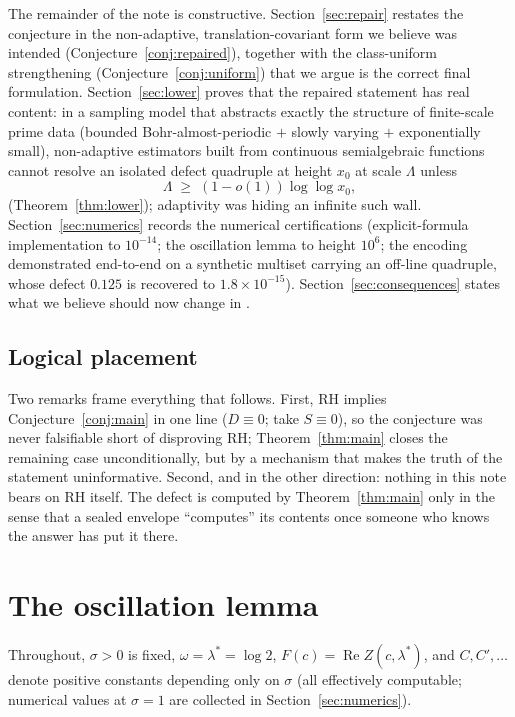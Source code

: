 \documentclass[11pt]{amsart}
\theoremstyle{definition}
\theoremstyle{remark}
\DeclareMathOperator{\Rre}{Re}
\begin{document}
The remainder of the note is constructive. Section~\ref{sec:repair} restates the conjecture in the non-adaptive, translation-covariant form we believe was intended (Conjecture~\ref{conj:repaired}), together with the class-uniform strengthening (Conjecture~\ref{conj:uniform}) that we argue is the correct final formulation. Section~\ref{sec:lower} proves that the repaired statement has real content: in a sampling model that abstracts exactly the structure of finite-scale prime data (bounded Bohr-almost-periodic $+$ slowly varying $+$ exponentially small), non-adaptive estimators built from continuous semialgebraic functions cannot resolve an isolated defect quadruple at height $x_0$ at scale $\Lambda$ unless
\[
\Lambda\;\ge\;(1-o(1))\log\log x_0 ,
\]
(Theorem~\ref{thm:lower}); adaptivity was hiding an infinite such wall. Section~\ref{sec:numerics} records the numerical certifications (explicit-formula implementation to $10^{-14}$; the oscillation lemma to height $10^6$; the encoding demonstrated end-to-end on a synthetic multiset carrying an off-line quadruple, whose defect $0.125$ is recovered to $1.8\times10^{-15}$). Section~\ref{sec:consequences} states what we believe should now change in \cite{SI}.

\subsection*{Logical placement}
Two remarks frame everything that follows. First, RH implies Conjecture~\ref{conj:main} in one line ($D\equiv0$; take $S\equiv0$), so the conjecture was never falsifiable short of disproving RH; Theorem~\ref{thm:main} closes the remaining case unconditionally, but by a mechanism that makes the truth of the statement uninformative. Second, and in the other direction: nothing in this note bears on RH itself. The defect is computed by Theorem~\ref{thm:main} only in the sense that a sealed envelope ``computes'' its contents once someone who knows the answer has put it there.

\section{The oscillation lemma}\label{sec:osc}

Throughout, $\sigma>0$ is fixed, $\omega=\lambda^*=\log2$, $F(c)=\Rre Z(c,\lambda^*)$, and $C,C',\dots$ denote positive constants depending only on $\sigma$ (all effectively computable; numerical values at $\sigma=1$ are collected in Section~\ref{sec:numerics}).
\end{document}
